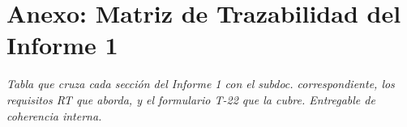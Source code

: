 \documentclass[11pt,a4paper,oneside]{report}
\newcommand{\nota}[1]{%
  \par\vspace{4pt}%
  {\small\color{lafroxGrato}\textit{#1}}%
  \par\vspace{6pt}%
}
\begin{document}














\chapter{Anexo: Matriz de Trazabilidad del Informe 1}
\nota{Tabla que cruza cada sección del Informe 1 con el subdoc. correspondiente, los requisitos RT que aborda, y el formulario T-22 que la cubre. Entregable de coherencia interna.}
\end{document}

